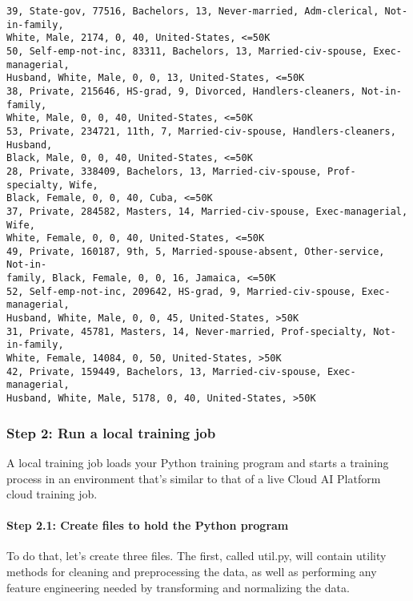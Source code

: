 \documentclass[11pt]{article}
\begin{document}
    \begin{Verbatim}[commandchars=\\\{\}]
39, State-gov, 77516, Bachelors, 13, Never-married, Adm-clerical, Not-in-family,
White, Male, 2174, 0, 40, United-States, <=50K
50, Self-emp-not-inc, 83311, Bachelors, 13, Married-civ-spouse, Exec-managerial,
Husband, White, Male, 0, 0, 13, United-States, <=50K
38, Private, 215646, HS-grad, 9, Divorced, Handlers-cleaners, Not-in-family,
White, Male, 0, 0, 40, United-States, <=50K
53, Private, 234721, 11th, 7, Married-civ-spouse, Handlers-cleaners, Husband,
Black, Male, 0, 0, 40, United-States, <=50K
28, Private, 338409, Bachelors, 13, Married-civ-spouse, Prof-specialty, Wife,
Black, Female, 0, 0, 40, Cuba, <=50K
37, Private, 284582, Masters, 14, Married-civ-spouse, Exec-managerial, Wife,
White, Female, 0, 0, 40, United-States, <=50K
49, Private, 160187, 9th, 5, Married-spouse-absent, Other-service, Not-in-
family, Black, Female, 0, 0, 16, Jamaica, <=50K
52, Self-emp-not-inc, 209642, HS-grad, 9, Married-civ-spouse, Exec-managerial,
Husband, White, Male, 0, 0, 45, United-States, >50K
31, Private, 45781, Masters, 14, Never-married, Prof-specialty, Not-in-family,
White, Female, 14084, 0, 50, United-States, >50K
42, Private, 159449, Bachelors, 13, Married-civ-spouse, Exec-managerial,
Husband, White, Male, 5178, 0, 40, United-States, >50K
    \end{Verbatim}

    \hypertarget{step-2-run-a-local-training-job}{%
\subsubsection{Step 2: Run a local training
job}\label{step-2-run-a-local-training-job}}

A local training job loads your Python training program and starts a
training process in an environment that's similar to that of a live
Cloud AI Platform cloud training job.

    \hypertarget{step-2.1-create-files-to-hold-the-python-program}{%
\paragraph{Step 2.1: Create files to hold the Python
program}\label{step-2.1-create-files-to-hold-the-python-program}}

To do that, let's create three files. The first, called util.py, will
contain utility methods for cleaning and preprocessing the data, as well
as performing any feature engineering needed by transforming and
normalizing the data.
\end{document}
